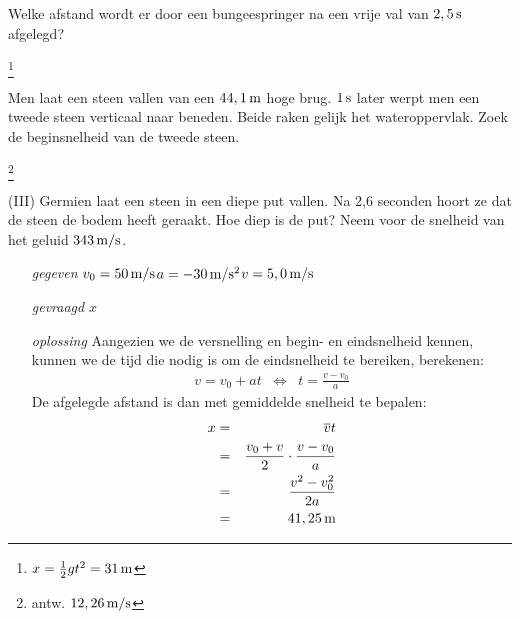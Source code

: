 \documentclass{ximera}
\begin{document}
\begin{exercise} Welke afstand wordt er door een bungeespringer na een vrije val van $2,5\rm\,s$ afgelegd?
\begin{oplossing}
\footnote{$x=\frac{1}{2}gt^2=31\rm\,m$}
\end{oplossing}







\end{exercise}

\begin{exercise} Men laat een steen vallen van een $44,1\rm\,m$ hoge brug. $1\rm\,s$ later werpt men een tweede steen verticaal naar beneden. Beide raken gelijk het wateroppervlak. Zoek de beginsnelheid van de tweede steen.
\begin{oplossing}
\footnote{antw. $12,26\rm\,m/s$}
\end{oplossing}












\end{exercise}

\begin{exercise} (III) Germien laat een steen in een diepe put vallen. Na 2,6 seconden hoort ze dat de steen de bodem heeft geraakt. Hoe diep is de put? Neem voor de snelheid van het geluid $343\rm\,m/s$.




\begin{oplossing}
\begin{enumerate}
\item[\textit{gegeven}]$v_0=50\rm\,m/s$\newline$a=-30\rm\,m/s^2$\newline$v=5,0\rm\,m/s$
\item[\textit{gevraagd}]$x$
\item[\textit{oplossing}]Aangezien we de versnelling en begin- en eindsnelheid kennen, kunnen we de tijd die nodig is om de eindsnelheid te bereiken, berekenen:
\begin{eqnarray*}
v=v_0+at&\Leftrightarrow&t=\frac{v-v_0}{a}
\end{eqnarray*}
De afgelegde afstand is dan met gemiddelde snelheid te bepalen:
\begin{eqnarray*}
x&=&\overline{v}t\\
&=&\frac{v_0+v}{2}\cdot\frac{v-v_0}{a}\\
&=&\frac{v^2-v_0^2}{2a}\\
&=&41,25\rm\,m
\end{eqnarray*}
\end{enumerate}
\end{oplossing}
	



\end{exercise}
\end{document}
